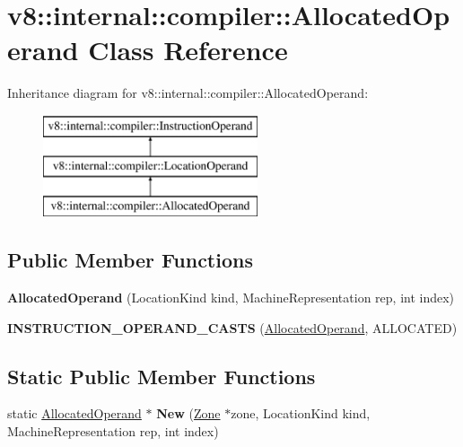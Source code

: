 \hypertarget{classv8_1_1internal_1_1compiler_1_1_allocated_operand}{}\section{v8\+:\+:internal\+:\+:compiler\+:\+:Allocated\+Operand Class Reference}
\label{classv8_1_1internal_1_1compiler_1_1_allocated_operand}
Inheritance diagram for v8\+:\+:internal\+:\+:compiler\+:\+:Allocated\+Operand\+:\begin{figure}[H]
\begin{center}
\leavevmode
\includegraphics[height=3.000000cm]{classv8_1_1internal_1_1compiler_1_1_allocated_operand}
\end{center}
\end{figure}
\subsection*{Public Member Functions}
\begin{DoxyCompactItemize}
\item 
{\bfseries Allocated\+Operand} (Location\+Kind kind, Machine\+Representation rep, int index)\hypertarget{classv8_1_1internal_1_1compiler_1_1_allocated_operand_a1e23e5746e40802c4376243abdbe8e48}{}\label{classv8_1_1internal_1_1compiler_1_1_allocated_operand_a1e23e5746e40802c4376243abdbe8e48}

\item 
{\bfseries I\+N\+S\+T\+R\+U\+C\+T\+I\+O\+N\+\_\+\+O\+P\+E\+R\+A\+N\+D\+\_\+\+C\+A\+S\+TS} (\hyperlink{classv8_1_1internal_1_1compiler_1_1_allocated_operand}{Allocated\+Operand}, A\+L\+L\+O\+C\+A\+T\+ED)\hypertarget{classv8_1_1internal_1_1compiler_1_1_allocated_operand_a7dc1520248d33f029a009fdc7d5951a1}{}\label{classv8_1_1internal_1_1compiler_1_1_allocated_operand_a7dc1520248d33f029a009fdc7d5951a1}

\end{DoxyCompactItemize}
\subsection*{Static Public Member Functions}
\begin{DoxyCompactItemize}
\item 
static \hyperlink{classv8_1_1internal_1_1compiler_1_1_allocated_operand}{Allocated\+Operand} $\ast$ {\bfseries New} (\hyperlink{classv8_1_1internal_1_1_zone}{Zone} $\ast$zone, Location\+Kind kind, Machine\+Representation rep, int index)\hypertarget{classv8_1_1internal_1_1compiler_1_1_allocated_operand_a5981dcc601391236e463e4afaee84bbe}{}\label{classv8_1_1internal_1_1compiler_1_1_allocated_operand_a5981dcc601391236e463e4afaee84bbe}

\end{DoxyCompactItemize}
